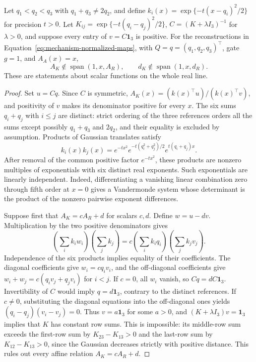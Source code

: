 \begin{proposition}
\label{prop:mechanism-distinct}
Let $q_1<q_2<q_3$ with $q_1+q_3\ne2q_2$, and define
$k_i(x)=\exp\{-t(x-q_i)^2/2\}$ for precision $t>0$.
Let $K_{ij}=\exp\{-t(q_i-q_j)^2/2\}$,
$C=(K+\lambda I_3)^{-1}$ for $\lambda>0$, and suppose every entry of
$v=C\mathbf1_3$ is positive. For the reconstructions in
Equation~\eqref{eq:mechanism-normalized-maps}, with $Q=q=(q_1,q_2,q_3)^\top$,
gate $g=1$, and $A_A(x)=x$,
\[
 A_K\notin\operatorname{span}(1,x,A_R),\qquad
 d_K\notin\operatorname{span}(1,x,d_R).
\]
These are statements about scalar functions on the whole real line.
\end{proposition}
\begin{proof}
Set $u=Cq$. Since $C$ is symmetric,
$A_K(x)=(k(x)^\top u)/(k(x)^\top v)$, and positivity of $v$ makes
its denominator positive for every $x$. The six sums $q_i+q_j$ with
$i\leq j$ are distinct: strict ordering of the three references orders
all the sums except possibly $q_1+q_3$ and $2q_2$, and their equality
is excluded by assumption. Products of Gaussian translates satisfy
\[
 k_i(x)k_j(x)=
 e^{-tx^2}e^{-t(q_i^2+q_j^2)/2}e^{t(q_i+q_j)x}.
\]
After removal of the common positive factor $e^{-tx^2}$, these products
are nonzero multiples of exponentials with six distinct real exponents.
Such exponentials are linearly independent. Indeed, differentiating a
vanishing linear combination zero through fifth order at $x=0$ gives
a Vandermonde system whose determinant is the product of the nonzero
pairwise exponent differences.

Suppose first that $A_K=cA_R+d$ for scalars $c,d$. Define
$w=u-dv$. Multiplication by the two positive denominators gives
\[
 \left(\sum_i k_iw_i\right)\left(\sum_j k_j\right)
 =c\left(\sum_i k_iq_i\right)\left(\sum_j k_jv_j\right).
\]
Independence of the six products implies equality of their coefficients.
The diagonal coefficients give $w_i=cq_iv_i$, and the off-diagonal
coefficients give
$w_i+w_j=c(q_iv_j+q_jv_i)$ for $i<j$.
If $c=0$, all $w_i$ vanish, so $Cq=dC\mathbf1_3$. Invertibility of
$C$ would imply $q=d\mathbf1_3$, contrary to the distinct references.
If $c\ne0$, substituting the diagonal equations into the off-diagonal
ones yields $(q_i-q_j)(v_i-v_j)=0$. Thus $v=a\mathbf1_3$ for some
$a>0$, and $(K+\lambda I_3)v=\mathbf1_3$ implies that $K$ has
constant row sums. This is impossible: its middle-row sum exceeds the
first-row sum by $K_{23}-K_{13}>0$ and the last-row sum by
$K_{12}-K_{13}>0$, since the Gaussian decreases strictly with positive
distance. This rules out every affine relation $A_K=cA_R+d$.


\end{proof}

